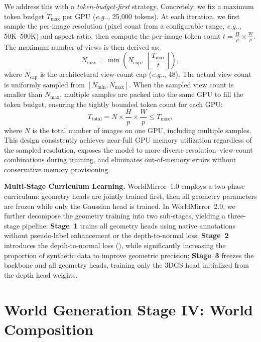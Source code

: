 \documentclass{article} %
\makeatletter
\DeclareRobustCommand\onedot{\futurelet\@let@token\@onedot}
\def\@onedot{\ifx\@let@token.\else.\null\fi\xspace}
\def\eg{\emph{e.g}\onedot} \def\Eg{\emph{E.g}\onedot}
\makeatother
\begin{document}
We address this with a \emph{token-budget-first} strategy. Concretely, we fix a maximum token budget $T_{\text{max}}$ per GPU (\eg, 25{,}000 tokens). At each iteration, we first sample the per-image resolution (pixel count from a configurable range, \eg, 50K--500K) and aspect ratio, then compute the per-image token count $t = \frac{H}{p} \times \frac{W}{p}$. The maximum number of views is then derived as:
\begin{equation}
    N_{\text{max}} = \min\!\left(N_{\text{cap}},\;\left\lfloor \frac{T_{\text{max}}}{t} \right\rfloor\right),
\end{equation}
where $N_{\text{cap}}$ is the architectural view-count cap (\eg, 48). The actual view count is uniformly sampled from $[N_{\text{min}}, N_{\text{max}}]$. When the sampled view count is smaller than $N_{\text{max}}$, multiple samples are packed into the same GPU to fill the token budget, ensuring the tightly bounded token count for each GPU:
\begin{equation}
    T_{\text{total}} = N \times \frac{H}{p} \times \frac{W}{p} \leq T_{\text{max}},
\end{equation}
where $N$ is the total number of images on one GPU, including multiple samples. This design consistently achieves near-full GPU memory utilization regardless of the sampled resolution, exposes the model to more diverse resolution--view-count combinations during training, and eliminates out-of-memory errors without conservative memory provisioning.

\textbf{Multi-Stage Curriculum Learning.}
\label{sec:multi_stage}
WorldMirror~1.0 employs a two-phase curriculum: geometry heads are jointly trained first, then all geometry parameters are frozen while only the Gaussian head is trained. In WorldMirror~2.0, we further decompose the geometry training into two sub-stages, yielding a three-stage pipeline: \textbf{Stage~1} trains all geometry heads using native annotations without pseudo-label enhancement or the depth-to-normal loss; \textbf{Stage~2} introduces  the depth-to-normal loss (), while significantly increasing the proportion of synthetic data to improve geometric precision; \textbf{Stage~3} freezes the backbone and all geometry heads, training only the 3DGS head initialized from the depth head weights.

 

\section{World Generation Stage IV: World Composition}
\label{sec:world_composition}
\end{document}
